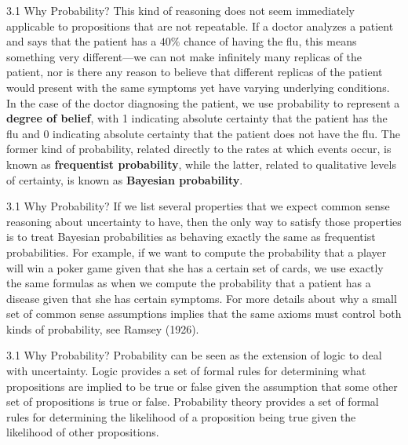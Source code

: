 \begin{frame}{3.1 Why Probability?}
    \justifying
    This kind of reasoning does not seem immediately applicable to propositions that are not repeatable. If a doctor analyzes a patient and says that the patient has a $40\%$ chance of having the flu, this means something very different—we can not make infinitely many replicas of the patient, nor is there any reason to believe that different replicas of the patient would present with the same symptoms yet have varying underlying conditions. In the case of the doctor diagnosing the patient, we use probability to represent a \textbf{degree of belief}, with 1 indicating absolute certainty that the patient has the flu and 0 indicating absolute certainty that the patient does not have the flu. The former kind of probability, related directly to the rates at which events occur, is known as \textbf{frequentist probability}, while the latter, related to qualitative levels of certainty, is known as \textbf{Bayesian probability}.
\end{frame}

\begin{frame}{3.1 Why Probability?}
    \justifying
    If we list several properties that we expect common sense reasoning about uncertainty to have, then the only way to satisfy those properties is to treat Bayesian probabilities as behaving exactly the same as frequentist probabilities. For example, if we want to compute the probability that a player will win a poker game given that she has a certain set of cards, we use exactly the same formulas as when we compute the probability that a patient has a disease given that she has certain symptoms. For more details about why a small set of common sense assumptions implies that the same axioms must control both kinds of probability, see Ramsey (1926).
\end{frame}

\begin{frame}{3.1 Why Probability?}
    \justifying
    Probability can be seen as the extension of logic to deal with uncertainty. Logic provides a set of formal rules for determining what propositions are implied to be true or false given the assumption that some other set of propositions is true or false. Probability theory provides a set of formal rules for determining the likelihood of a proposition being true given the likelihood of other propositions.
\end{frame}

